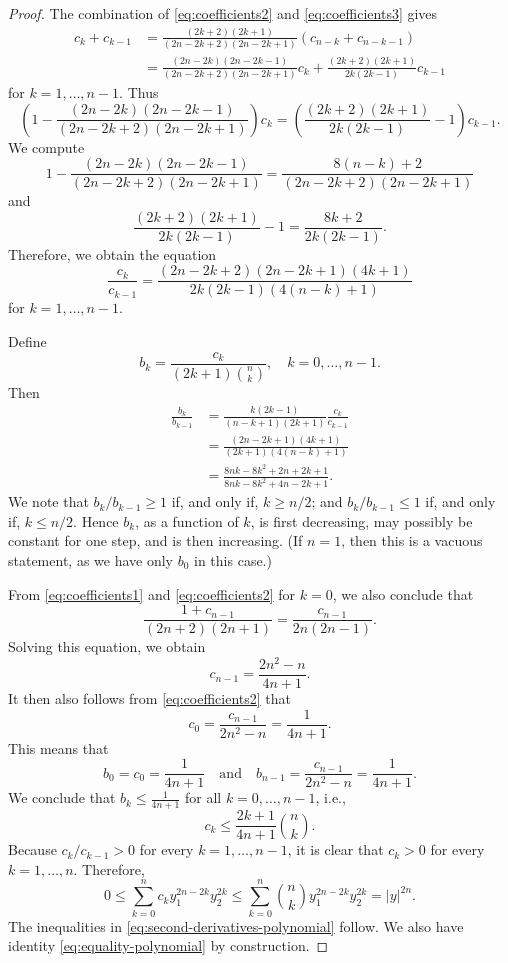 \documentclass[a4paper]{article}
\theoremstyle{definition}
\theoremstyle{remark}
\begin{document}
\begin{proof}
The combination of \eqref{eq:coefficients2} and \eqref{eq:coefficients3} gives
\[
\begin{split}
c_k + c_{k - 1} & = \frac{(2k + 2)(2 k + 1)}{(2n - 2k + 2)(2n - 2k + 1)}(c_{n - k} + c_{n - k - 1}) \\
& = \frac{(2n - 2k)(2n - 2k - 1)}{(2n - 2k + 2)(2n - 2k + 1)} c_k + \frac{(2k + 2)(2 k + 1)}{2k(2k - 1)} c_{k - 1}
\end{split}
\]
for $k = 1, \dotsc, n - 1$. Thus
\[
\left(1 - \frac{(2n - 2k)(2n - 2k - 1)}{(2n - 2k + 2)(2n - 2k + 1)}\right) c_k = \left(\frac{(2k + 2)(2 k + 1)}{2k(2k - 1)} - 1\right) c_{k - 1}.
\]
We compute
\[
1 - \frac{(2n - 2k)(2n - 2k - 1)}{(2n - 2k + 2)(2n - 2k + 1)} = \frac{8(n - k) + 2}{(2n - 2k + 2)(2n - 2k + 1)}
\]
and
\[
\frac{(2k + 2)(2 k + 1)}{2k(2k - 1)} - 1 = \frac{8k + 2}{2k(2k - 1)}.
\]
Therefore, we obtain the equation
\[
\frac{c_k}{c_{k - 1}} = \frac{(2n - 2k + 2)(2n - 2k + 1)(4k + 1)}{2k(2k - 1)(4(n - k) + 1)}
\]
for $k = 1, \dotsc, n - 1$.

Define
\[
b_k = \frac{c_k}{(2k + 1)\binom{n}{k}}, \quad k = 0, \dotsc, n - 1.
\]
Then
\[
\begin{split}
\frac{b_k}{b_{k - 1}} & = \frac{k(2k - 1)}{(n - k + 1)(2k + 1)} \frac{c_k}{c_{k - 1}} \\
& = \frac{(2n - 2k + 1)(4k + 1)}{(2k + 1)(4(n - k) + 1)} \\
& = \frac{8nk - 8k^2 + 2n + 2k + 1}{8nk - 8k^2 + 4n - 2k + 1}.
\end{split}
\]
We note that $b_k/b_{k - 1} \ge 1$ if, and only if, $k \ge n/2$; and
$b_k/b_{k - 1} \le 1$ if, and only if, $k \le n/2$.
Hence $b_k$, as a function of $k$, is first decreasing, may possibly be constant
for one step, and is then increasing. (If $n = 1$, then this is a vacuous statement, as
we have only $b_0$ in this case.)

From \eqref{eq:coefficients1} and \eqref{eq:coefficients2} for $k = 0$, we also
conclude that
\[
\frac{1 + c_{n - 1}}{(2n + 2)(2n + 1)} = \frac{c_{n - 1}}{2n(2n - 1)}.
\]
Solving this equation, we obtain
\[
c_{n - 1} = \frac{2n^2 - n}{4n + 1}.
\]
It then also follows from \eqref{eq:coefficients2} that
\[
c_0 = \frac{c_{n - 1}}{2n^2 - n} = \frac{1}{4n + 1}.
\]
This means that
\[
b_0 = c_0 = \frac{1}{4n + 1} \quad \text{and} \quad b_{n - 1} = \frac{c_{n - 1}}{2n^2 - n} = \frac{1}{4n + 1}.
\]
We conclude that $b_k \le \frac{1}{4n + 1}$ for all $k = 0, \dotsc, n - 1$,
i.e.,
\[
c_k \le \frac{2k + 1}{4n + 1} \binom{n}{k}.
\]
Because $c_k/c_{k - 1} > 0$ for every $k = 1, \dotsc, n - 1$, it is clear that
$c_k > 0$ for every $k = 1, \dotsc, n$. Therefore,
\[
0 \le \sum_{k = 0}^n c_k y_1^{2n - 2k} y_2^{2k} \le \sum_{k = 0}^n \binom{n}{k} y_1^{2n - 2k} y_2^{2k} = |y|^{2n}.
\]
The inequalities in \eqref{eq:second-derivatives-polynomial} follow.
We also have identity \eqref{eq:equality-polynomial} by construction.
\end{proof}
\end{document}
